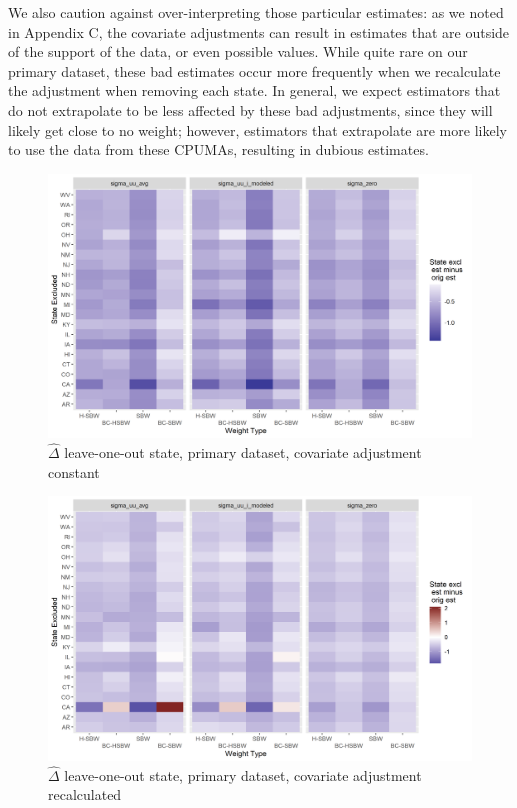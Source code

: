 \documentclass[12pt]{article}
\begin{document}
We also caution against over-interpreting those particular estimates: as we noted in Appendix C, the covariate adjustments can result in estimates that are outside of the support of the data, or even possible values. While quite rare on our primary dataset, these bad estimates occur more frequently when we recalculate the adjustment when removing each state. In general, we expect estimators that do not extrapolate to be less affected by these bad adjustments, since they will likely get close to no weight; however, estimators that extrapolate are more likely to use the data from these CPUMAs, resulting in dubious estimates. 

\begin{figure}[]
\begin{center}
    \includegraphics[scale=0.6]{01_Plots/loostate-repub-sensitivityc1-state-main.png}
    \caption{$\hat{\Delta}$ leave-one-out state, primary dataset, covariate adjustment constant}
    \label{fig:rdiffc1state}
\end{center}
\end{figure}

\begin{figure}[]
\begin{center}
    \includegraphics[scale=0.6]{01_Plots/loostate-repub-sensitivityc1-proc-main.png}
    \caption{$\hat{\Delta}$ leave-one-out state, primary dataset, covariate adjustment recalculated}
    \label{fig:rdiffc1proc}
\end{center}
\end{figure}
\end{document}
